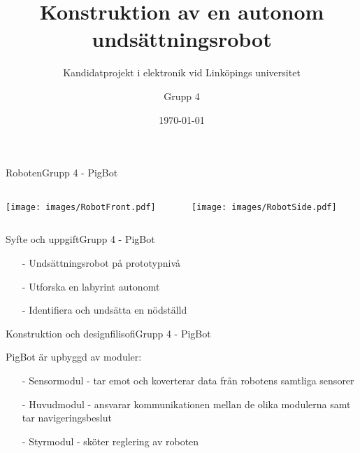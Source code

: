 \usepackage{extras}

\title{Konstruktion av en autonom undsättningsrobot}
\subtitle{Kandidatprojekt i elektronik vid Linköpings universitet}
\author{Grupp 4}
\beamertemplatenavigationsymbolsempty
\date{\today}



\begin{frame}
  \titlepage
\end{frame}


\begin{frame}{Roboten}{Grupp 4 - PigBot}
  \begin{columns}
    \begin{column}{0.5\textwidth}
      \texttt{[image: images/RobotFront.pdf]}
    \end{column}
    \begin{column}{0.5\textwidth}
      \texttt{[image: images/RobotSide.pdf]}
    \end{column}
  \end{columns}
\end{frame}

\begin{frame}{Syfte och uppgift}{Grupp 4 - PigBot}

  \begin{itemize}
    \item[-] Undsättningsrobot på prototypnivå
    \item[-] Utforska en labyrint autonomt
    \item[-] Identifiera och undsätta en nödställd
  \end{itemize}
\end{frame}

\begin{frame}{Konstruktion och designfilisofi}{Grupp 4 - PigBot}

PigBot är upbyggd av moduler:
\pause
  \begin{itemize}
    \item[-] Sensormodul - tar emot och koverterar data från robotens samtliga sensorer
\pause
    \item[-] Huvudmodul - ansvarar kommunikationen mellan de olika modulerna samt tar navigeringsbeslut
\pause
    \item[-] Styrmodul - sköter reglering av roboten
  \end{itemize}
\end{frame}

